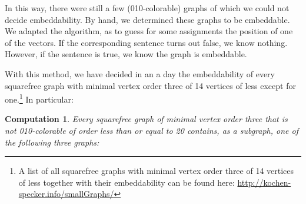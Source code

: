 \documentclass[adraft,copyright,creativecommons]{eptcs}
\newcounter{main}
\newtheorem{comp}[main]{Computation}
\theoremstyle{definition}
\theoremstyle{remark}
\begin{document}
In this way, there were still a few (010-colorable) graphs of which
we could not decide embeddability.
By hand, we determined these graphs to be embeddable.
We adapted the algorithm, as to guess
for some assignments the position of one of the vectors.
If the corresponding
sentence turns out false, we know nothing.  However,
if the sentence is true, we know the graph is embeddable.

With this method, we have decided in an a day the embeddability
of every squarefree graph with minimal vertex order three of 14
vertices of less except for one.\footnote{
A list of all squarefree graphs with minimal vertex order three of
14 vertices of less together with their embeddability can
be found here:
\url{http://kochen-specker.info/smallGraphs/}
}
In particular:
\begin{comp}\label{comp:unemb20}
    Every squarefree graph of minimal vertex order three
    that is not 010-colorable
    of order less than or equal to 20
    contains, as a subgraph, one of the following three graphs:
    \begin{center}
        \qquad
        \qquad
\end{center}
\end{comp}
\end{document}
